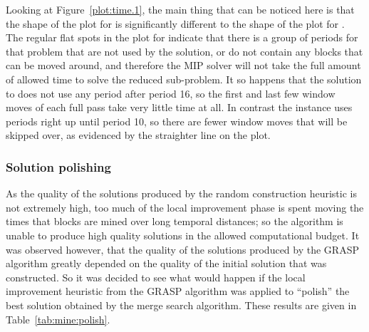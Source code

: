 \documentclass[journal]{IEEEtran}
\begin{document}
Looking at Figure~\ref{plot:time.1}, the main thing that can be noticed here is that the shape of the plot for \zucksmall{} is significantly different to the shape of the plot for \dmine{}. The regular flat spots in the plot for \zucksmall{} indicate that there is a group of periods for that problem that are not used by the solution, or do not contain any blocks that can be moved around, and therefore the MIP solver will not take the full amount of allowed time to solve the reduced sub-problem. It so happens that the solution to \zucksmall{} does not use any period after period 16, so the first and last few window moves of each full pass take very little time at all. In contrast the \dmine{} instance uses periods right up until period 10, so there are fewer window moves that will be skipped over, as evidenced by the straighter line on the plot.

\subsubsection*{Solution polishing}

As the quality of the solutions produced by the random construction heuristic is not extremely high, too much of the local improvement phase is spent moving the times that blocks are mined over long temporal distances; so the algorithm is unable to produce high quality solutions in the allowed computational budget. It was observed however, that the quality of the solutions produced by the GRASP algorithm greatly depended on the quality of the initial solution that was constructed. So it was decided to see what would happen if the local improvement heuristic from the GRASP algorithm was applied to ``polish'' the best solution obtained by the merge search algorithm. These results are given in Table~\ref{tab:mine:polish}.

% 
\end{document}
